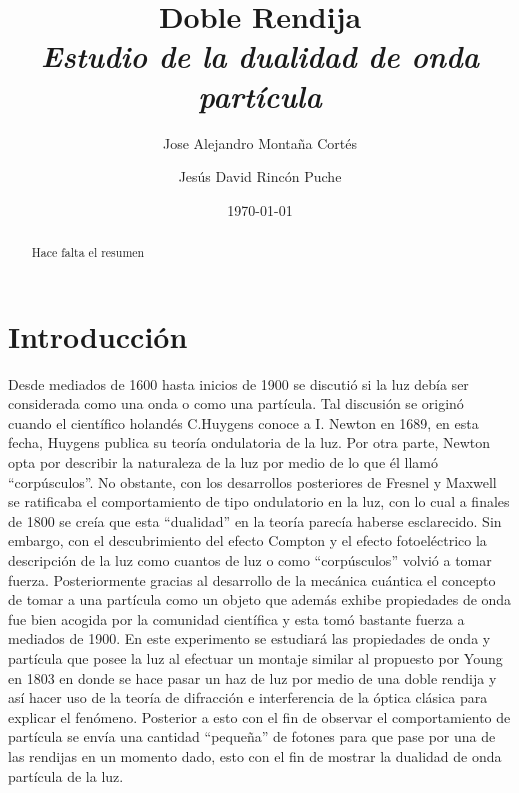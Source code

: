\documentclass[%
 reprint,
 amsmath,amssymb,
 aps,
]{revtex4-1}
\newcommand{\subtitle}[1]{%
\posttitle{%
    \par\end{center}
\begin{center}\large#1\end{center}
\vskip0.5em}%
}
\begin{document}

\title{Doble Rendija\\ \textit{Estudio de la dualidad de onda partícula} }%


\author{Jose Alejandro Montaña Cortés}
\author{Jesús David Rincón Puche}%
%


\date{\today}%

\begin{abstract}

Hace falta el resumen

\end{abstract}
\maketitle

\section{Introducción}
Desde mediados de 1600 hasta inicios de 1900 se discutió si la luz debía ser considerada como una onda o como una partícula. Tal discusión se originó cuando el científico holandés C.Huygens conoce a  I. Newton en 1689, en esta fecha, Huygens publica su  teoría ondulatoria de la luz. Por otra parte, Newton opta por describir la naturaleza de la luz por medio de lo que él llamó “corpúsculos”. No obstante, con los desarrollos posteriores de Fresnel y Maxwell se ratificaba el comportamiento de tipo ondulatorio en la luz, con lo cual a finales de 1800 se creía que esta “dualidad” en la teoría parecía haberse esclarecido. Sin embargo, con el descubrimiento del efecto Compton y el efecto fotoeléctrico la descripción de la luz como cuantos de luz o como “corpúsculos” volvió a tomar fuerza. Posteriormente gracias al desarrollo de la mecánica cuántica el concepto de tomar a una partícula como un objeto que además exhibe propiedades de onda fue bien acogida por la comunidad científica y esta tomó bastante fuerza a mediados de 1900. En este experimento se estudiará las propiedades de onda y partícula que posee la luz al efectuar un montaje similar al propuesto por Young en 1803 en donde se hace pasar un haz de luz por medio de una doble rendija y así hacer uso de la teoría de difracción e interferencia de la óptica clásica para explicar el fenómeno. Posterior a esto con el fin de observar el comportamiento de partícula se envía una cantidad “pequeña” de fotones para que pase por una de las rendijas en un momento dado, esto con el fin de mostrar la dualidad de onda partícula de la luz.
\end{document}

